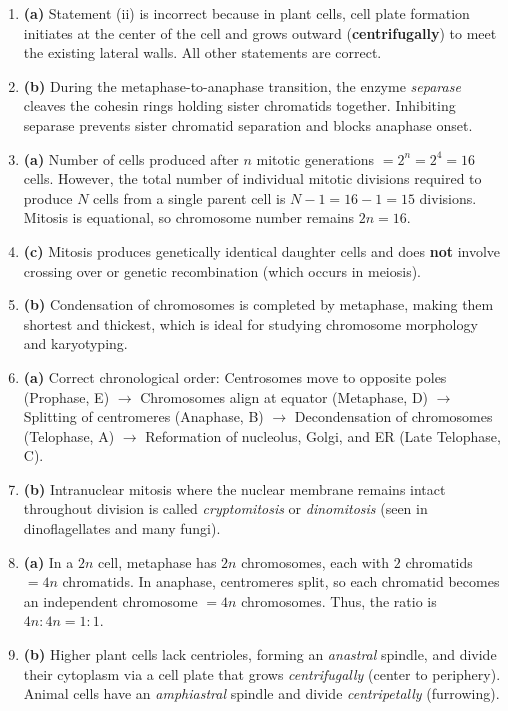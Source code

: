 \documentclass[11pt,a4paper]{article}
\begin{document}
\begin{enumerate}[label=\textbf{\arabic*.}, leftmargin=*]
\item \textbf{(a)} Statement (ii) is incorrect because in plant cells, cell plate formation initiates at the center of the cell and grows outward (\textbf{centrifugally}) to meet the existing lateral walls. All other statements are correct.

\item \textbf{(b)} During the metaphase-to-anaphase transition, the enzyme \textit{separase} cleaves the cohesin rings holding sister chromatids together. Inhibiting separase prevents sister chromatid separation and blocks anaphase onset.

\item \textbf{(a)} Number of cells produced after $n$ mitotic generations $= 2^n = 2^4 = 16$ cells. However, the total number of individual mitotic divisions required to produce $N$ cells from a single parent cell is $N - 1 = 16 - 1 = 15$ divisions. Mitosis is equational, so chromosome number remains $2n = 16$.

\item \textbf{(c)} Mitosis produces genetically identical daughter cells and does \textbf{not} involve crossing over or genetic recombination (which occurs in meiosis).

\item \textbf{(b)} Condensation of chromosomes is completed by metaphase, making them shortest and thickest, which is ideal for studying chromosome morphology and karyotyping.

\item \textbf{(a)} Correct chronological order: Centrosomes move to opposite poles (Prophase, E) $\rightarrow$ Chromosomes align at equator (Metaphase, D) $\rightarrow$ Splitting of centromeres (Anaphase, B) $\rightarrow$ Decondensation of chromosomes (Telophase, A) $\rightarrow$ Reformation of nucleolus, Golgi, and ER (Late Telophase, C).

\item \textbf{(b)} Intranuclear mitosis where the nuclear membrane remains intact throughout division is called \textit{cryptomitosis} or \textit{dinomitosis} (seen in dinoflagellates and many fungi).

\item \textbf{(a)} In a $2n$ cell, metaphase has $2n$ chromosomes, each with $2$ chromatids $= 4n$ chromatids. In anaphase, centromeres split, so each chromatid becomes an independent chromosome $= 4n$ chromosomes. Thus, the ratio is $4n : 4n = 1 : 1$.

\item \textbf{(b)} Higher plant cells lack centrioles, forming an \textit{anastral} spindle, and divide their cytoplasm via a cell plate that grows \textit{centrifugally} (center to periphery). Animal cells have an \textit{amphiastral} spindle and divide \textit{centripetally} (furrowing).


\end{enumerate}
\end{document}
